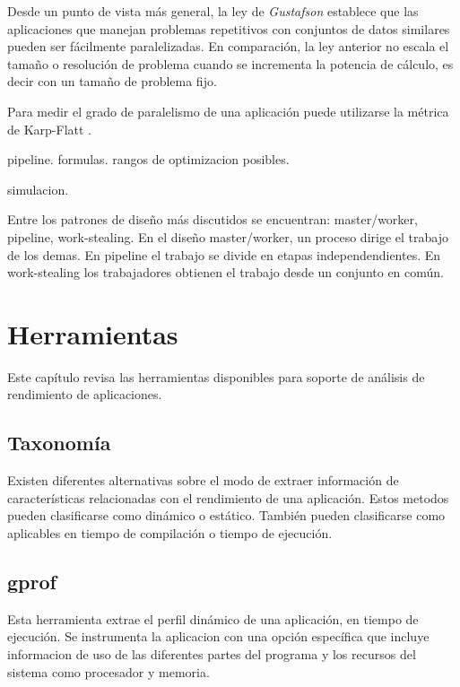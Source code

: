 \documentclass[a4paper]{report}
\begin{document}
\bigskip

Desde un punto de vista m\'as general, la ley de {\it Gustafson}
\cite{gustafson} establece que las aplicaciones que manejan problemas
repetitivos con conjuntos de datos similares pueden ser f\'acilmente
paralelizadas. En comparaci\'on, la ley anterior no escala el tama\~no o
resoluci\'on de problema cuando se incrementa la potencia de c\'alculo, es
decir con un tama\~no de problema fijo.

\bigskip

Para medir el grado de paralelismo de una aplicaci\'on puede utilizarse la
m\'etrica de Karp-Flatt \cite{karp-flatt}.

pipeline. formulas. rangos de optimizacion posibles.

simulacion.

\bigskip

Entre los patrones de dise\~no m\'as discutidos se encuentran: master/worker,
pipeline, work-stealing. En el dise\~no master/worker, un proceso dirige el
trabajo de los demas. En pipeline el trabajo se divide en etapas
independendientes. En work-stealing los trabajadores obtienen el trabajo desde
un conjunto en com\'un.

\chapter{Herramientas}

Este cap\'itulo revisa las herramientas disponibles para soporte de an\'alisis
de rendimiento de aplicaciones.

\section{Taxonom\'ia}

Existen diferentes alternativas sobre el modo de extraer informaci\'on de
caracter\'isticas relacionadas con el rendimiento de una aplicaci\'on.
Estos metodos pueden clasificarse como din\'amico o est\'atico.
Tambi\'en pueden clasificarse como aplicables en tiempo de compilaci\'on o
tiempo de ejecuci\'on.

\section{gprof}

Esta herramienta extrae el perfil din\'amico de una aplicaci\'on, en tiempo
de ejecuci\'on. Se instrumenta la aplicacion con una opci\'on espec\'ifica que
incluye informacion de uso de las diferentes partes del programa y los
recursos del sistema como procesador y memoria.
\end{document}
